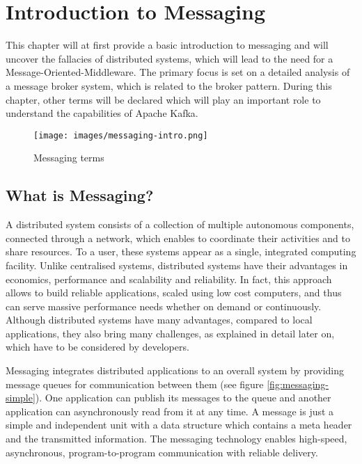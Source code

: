 \chapter{Introduction to Messaging} 

This chapter will at first provide a basic introduction to messaging and will
uncover the fallacies of distributed systems, which will lead to the need for a
Message-Oriented-Middleware. The primary focus is set on a detailed analysis of a
message broker system, which is related to the broker pattern. During this
chapter, other terms will be declared which will play an important role to
understand the capabilities of Apache Kafka.

\begin{figure}[H]
    \centering
    \texttt{[image: images/messaging-intro.png]}
    \caption{Messaging terms}
    \label{fig:MBig:the-log}
\end{figure}

\section{What is Messaging?}

A distributed system consists of a collection of multiple autonomous components,
connected through a network, which enables to coordinate  their activities and
to share resources. To a user, these systems appear as a single, integrated
computing facility. Unlike centralised systems, distributed systems have their
advantages in economics, performance and scalability and reliability. In fact,
this approach allows to build reliable applications, scaled using low cost
computers, and thus can serve massive performance needs whether on demand or
continuously.  Although distributed systems have many advantages, compared to
local applications, they also bring many challenges, as explained in detail
later on, which have to be considered by developers.\cite{POSA1}\cite{TAN06}

Messaging integrates distributed applications to an overall system by providing
message queues for communication between them (see figure
\ref{fig:messaging-simple}). One application can publish its messages to the
queue and another application can asynchronously read from it at any time.
A message is just a simple and independent unit with a data structure
which contains a meta header and the transmitted information. The messaging
technology enables high-speed, asynchronous, program-to-program communication
with reliable delivery.

